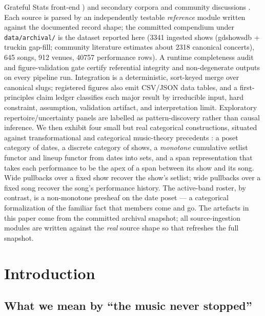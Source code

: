 \documentclass[
]{article}
\begin{document}
Grateful Stats front-end \citep{grateful_stats}) and secondary corpora
and community discussions
\citep{grateful_data_tutorial, jerry_pycia, gd_reviews_corpus, reddit_data_sets, reddit_lyrics_attribution, reddit_setlist_db, reddit_spreadsheet_archive}.
Each source is parsed by an independently testable \emph{reference}
module written against the documented record shape; the committed
compendium under \texttt{data/archival/} is the dataset reported here
(3341 ingested shows (gdshowsdb + truckin gap-fill; community literature
estimates about 2318 canonical concerts), 645 songs, 912
venues, 40757 performance rows). A runtime completeness audit and
figure-validation gate certify referential integrity and non-degenerate
outputs on every pipeline run. Integration is a deterministic,
sort-keyed merge over canonical slugs; registered figures also emit
CSV/JSON data tables, and a first-principles claim ledger classifies
each major result by irreducible input, hard constraint, assumption,
validation artifact, and interpretation limit. Exploratory
repertoire/uncertainty panels are labelled as pattern-discovery rather
than causal inference. We then exhibit four small but real categorical
constructions, situated against transformational and categorical
music-theory precedents
\citep{lewin_gmit, padi_category_music_case_study, popoff_hidden_categories}:
a poset category of dates, a discrete category of shows, a
\emph{monotone} cumulative setlist functor and lineup functor from dates
into sets, and a span representation that takes each performance to be
the apex of a span between its show and its song. Wide pullbacks over a
fixed show recover the show's setlist; wide pullbacks over a fixed song
recover the song's performance history. The active-band roster, by
contrast, is a non-monotone presheaf on the date poset --- a categorical
formalization of the familiar fact that members come and go. The
artefacts in this paper come from the committed archival snapshot; all
source-ingestion modules are written against the \emph{real} source
shape so that
refreshes the full snapshot.

\newpage

\section{Introduction}\label{introduction}

\subsection{What we mean by ``the music never
stopped''}\label{what-we-mean-by-the-music-never-stopped}
\end{document}
